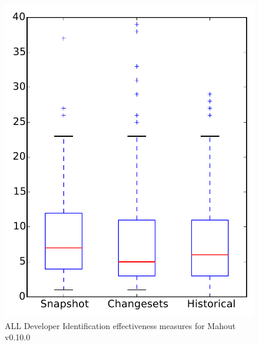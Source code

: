 
\begin{figure}
\centering
\includegraphics[height=0.4\textheight]{figures/dit/all_mahout}
\caption{ALL Developer Identification effectiveness measures for Mahout v0.10.0}
\label{fig:dit:all:mahout}
\end{figure}
